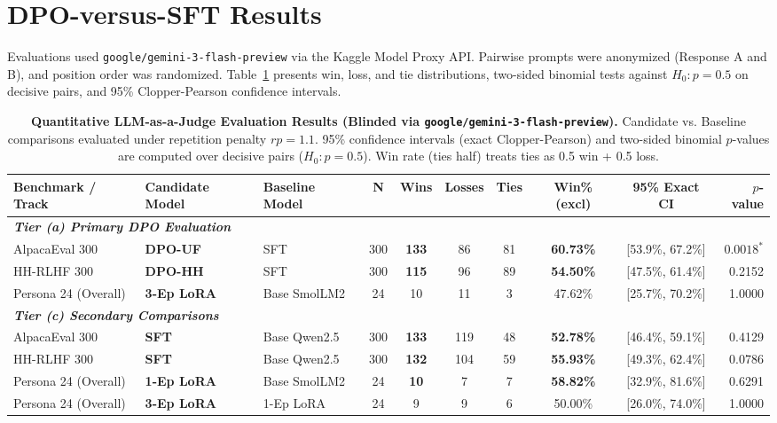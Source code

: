 \documentclass[11pt,a4paper]{article}
\begin{document}
\section{DPO-versus-SFT Results}
\label{sec:results}

Evaluations used \texttt{google/gemini-3-flash-preview} via the Kaggle Model Proxy API. Pairwise prompts were anonymized (Response A and B), and position order was randomized. Table~\ref{tab:quantitative} presents win, loss, and tie distributions, two-sided binomial tests against $H_0: p = 0.5$ on decisive pairs, and 95\% Clopper-Pearson confidence intervals.

\begin{table}[t]
\centering
\scriptsize
\setlength{\tabcolsep}{2.2pt}
\renewcommand{\arraystretch}{0.88}
\caption{\textbf{Quantitative LLM-as-a-Judge Evaluation Results (Blinded via \texttt{google/gemini-3-flash-preview}).} Candidate vs. Baseline comparisons evaluated under repetition penalty $rp=1.1$. 95\% confidence intervals (exact Clopper-Pearson) and two-sided binomial $p$-values are computed over decisive pairs ($H_0: p = 0.5$). Win rate (ties half) treats ties as 0.5 win + 0.5 loss.}
\label{tab:quantitative}
\begin{tabularx}{\textwidth}{lXXccccccr}
\toprule
\textbf{Benchmark / Track} & \textbf{Candidate Model} & \textbf{Baseline Model} & \textbf{N} & \textbf{Wins} & \textbf{Losses} & \textbf{Ties} & \textbf{Win\% (excl)} & \textbf{95\% Exact CI} & \textbf{$p$-value} \\
\midrule
\multicolumn{10}{l}{\textit{\textbf{Tier (a) Primary DPO Evaluation}}} \\
AlpacaEval 300 & \textbf{DPO-UF} & SFT & 300 & \textbf{133} & 86 & 81 & \textbf{60.73\%} & [53.9\%, 67.2\%] & $\mathbf{0.0018}^*$ \\
HH-RLHF 300 & \textbf{DPO-HH} & SFT & 300 & \textbf{115} & 96 & 89 & \textbf{54.50\%} & [47.5\%, 61.4\%] & 0.2152 \\
Persona 24 (Overall) & \textbf{3-Ep LoRA} & Base SmolLM2 & 24 & 10 & 11 & 3 & 47.62\% & [25.7\%, 70.2\%] & 1.0000 \\
\midrule
\multicolumn{10}{l}{\textit{\textbf{Tier (c) Secondary Comparisons}}} \\
AlpacaEval 300 & \textbf{SFT} & Base Qwen2.5 & 300 & \textbf{133} & 119 & 48 & \textbf{52.78\%} & [46.4\%, 59.1\%] & 0.4129 \\
HH-RLHF 300 & \textbf{SFT} & Base Qwen2.5 & 300 & \textbf{132} & 104 & 59 & \textbf{55.93\%} & [49.3\%, 62.4\%] & 0.0786 \\
Persona 24 (Overall) & \textbf{1-Ep LoRA} & Base SmolLM2 & 24 & \textbf{10} & 7 & 7 & \textbf{58.82\%} & [32.9\%, 81.6\%] & 0.6291 \\
Persona 24 (Overall) & \textbf{3-Ep LoRA} & 1-Ep LoRA & 24 & 9 & 9 & 6 & 50.00\% & [26.0\%, 74.0\%] & 1.0000 \\
\bottomrule
\end{tabularx}
\end{table}
\end{document}
